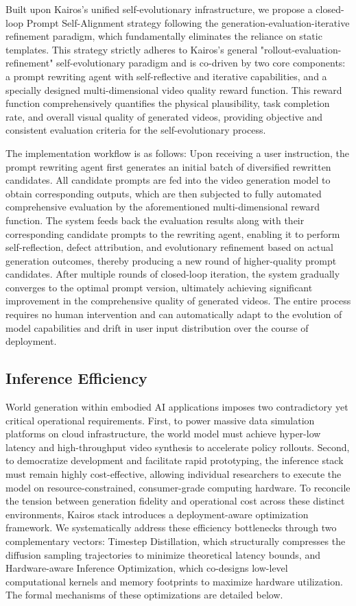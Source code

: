 \documentclass{llmxive}
\begin{document}
Built upon Kairos's unified self-evolutionary infrastructure, we propose a closed-loop Prompt Self-Alignment strategy following the generation-evaluation-iterative refinement paradigm, which fundamentally eliminates the reliance on static templates. This strategy strictly adheres to Kairos's general "rollout-evaluation-refinement" self-evolutionary paradigm and is co-driven by two core components: a prompt rewriting agent with self-reflective and iterative capabilities, and a specially designed multi-dimensional video quality reward function. This reward function comprehensively quantifies the physical plausibility, task completion rate, and overall visual quality of generated videos, providing objective and consistent evaluation criteria for the self-evolutionary process.

The implementation workflow is as follows: Upon receiving a user instruction, the prompt rewriting agent first generates an initial batch of diversified rewritten candidates. All candidate prompts are fed into the video generation model to obtain corresponding outputs, which are then subjected to fully automated comprehensive evaluation by the aforementioned multi-dimensional reward function. The system feeds back the evaluation results along with their corresponding candidate prompts to the rewriting agent, enabling it to perform self-reflection, defect attribution, and evolutionary refinement based on actual generation outcomes, thereby producing a new round of higher-quality prompt candidates. After multiple rounds of closed-loop iteration, the system gradually converges to the optimal prompt version, ultimately achieving significant improvement in the comprehensive quality of generated videos. The entire process requires no human intervention and can automatically adapt to the evolution of model capabilities and drift in user input distribution over the course of deployment.




\subsection{Inference Efficiency}
World generation within embodied AI applications imposes two contradictory yet critical operational requirements. First, to power massive data simulation platforms on cloud infrastructure, the world model must achieve hyper-low latency and high-throughput video synthesis to accelerate policy rollouts. Second, to democratize development and facilitate rapid prototyping, the inference stack must remain highly cost-effective, allowing individual researchers to execute the model on resource-constrained, consumer-grade computing hardware. To reconcile the tension between generation fidelity and operational cost across these distinct environments, Kairos stack introduces a deployment-aware optimization framework. We systematically address these efficiency bottlenecks through two complementary vectors: Timestep Distillation, which structurally compresses the diffusion sampling trajectories to minimize theoretical latency bounds, and Hardware-aware Inference Optimization, which co-designs low-level computational kernels and memory footprints to maximize hardware utilization. The formal mechanisms of these optimizations are detailed below.
\end{document}
